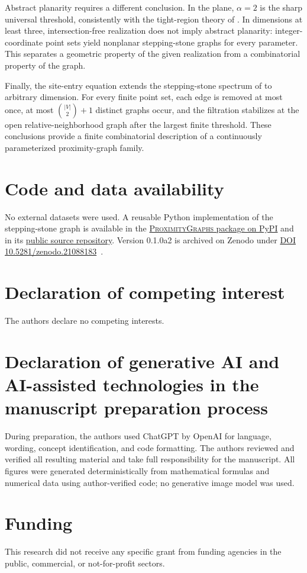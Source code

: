 \documentclass[a4paper,fleqn]{cas-sc}
\theoremstyle{definition}
\theoremstyle{remark}
\newcommand{\0}{\mathbf{0}}
\begin{document}
Abstract planarity requires a different conclusion. In the plane,
\(\alpha=2\) is the sharp universal threshold, consistently with the
tight-region theory of \citet{cardinal2009empty}. In dimensions at least
three, intersection-free realization does not imply abstract planarity:
integer-coordinate point sets yield nonplanar stepping-stone graphs for every
parameter. This separates a geometric property of the given realization from
a combinatorial property of the graph.

Finally, the site-entry equation extends the stepping-stone spectrum of
\citet{kannangara2018stepping} to arbitrary dimension. For every finite point
set, each edge is removed at most once, at most
\(\binom{|V|}{2}+1\) distinct graphs occur, and the filtration stabilizes
at the open relative-neighborhood graph after the largest finite threshold.
These conclusions provide a finite combinatorial description of a
continuously parameterized proximity-graph family.

\printcredits

\section*{Code and data availability}
No external datasets were used. A reusable Python implementation of the
stepping-stone graph is available in the
\href{https://pypi.org/project/proximitygraphs/}{\textsc{ProximityGraphs}
package on PyPI} and in its
\href{https://github.com/HectorMaravillo/ProximityGraphs}{public source
repository}. Version 0.1.0a2 is archived on Zenodo under
\href{https://doi.org/10.5281/zenodo.21088183}{DOI
10.5281/zenodo.21088183}~\citep{maravillo2026proximitygraphs}.

\section*{Declaration of competing interest}
The authors declare no competing interests.

\section*{Declaration of generative AI and AI-assisted technologies in the manuscript preparation process}
During preparation, the authors used ChatGPT by OpenAI for language,
wording, concept identification, and code formatting. The
authors reviewed and verified all resulting material and take full
responsibility for the manuscript. All figures were generated deterministically
from mathematical formulas and numerical data using author-verified code; no
generative image model was used.

\section*{Funding}
This research did not receive any specific grant from funding agencies in the public, commercial, or not-for-profit sectors.



\end{document}
